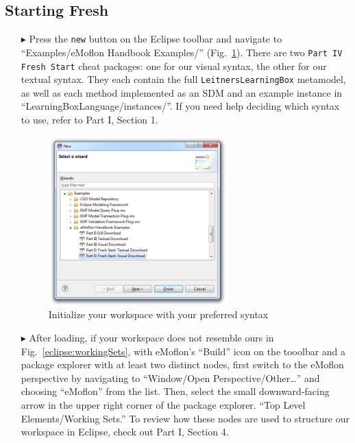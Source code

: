 \subsection{Starting Fresh}
\label{sec:loadSourceMeta}
\begin{itemize}

\item[$\blacktriangleright$] Press the \texttt{new} button on the Eclipse toolbar and navigate to ``Examples/eMoflon Handbook Examples/''
(Fig.~\ref{eclipse:downPartIV}). There are two \texttt{Part IV Fresh Start} cheat packages: one for our visual syntax, the other for our textual
syntax. They each contain the full \texttt{LeitnersLearningBox} metamodel, as well as each method implemented as an SDM and an example instance in
``LearningBoxLanguage/instances/''. If you need help deciding which syntax to use, refer to Part I, Section 1.

\begin{figure}[htbp]
\begin{center}
  \includegraphics[width=0.65\textwidth]{eclipse_part4FreshWizardDownload}
  \caption{Initialize your workspace with your preferred syntax}
  \label{eclipse:downPartIV}
\end{center}
\end{figure}

\vspace{0.5cm}

\item[$\blacktriangleright$] After loading, if your workspace does not resemble ours in Fig.~\ref{eclipse:workingSets}, with eMoflon's ``Build'' icon on the
tooolbar and a package explorer with at least two distinct nodes, first switch to the eMoflon perspective by navigating to ``Window/Open
Perspective/Other\ldots'' and choosing ``eMoflon'' from the list. Then, select the small downward-facing arrow in the upper right corner of the package
explorer. ``Top Level Elements/Working Sets.'' To review how these nodes are used to structure our workspace in Eclipse, check out Part I, Section 4.


\end{itemize}
